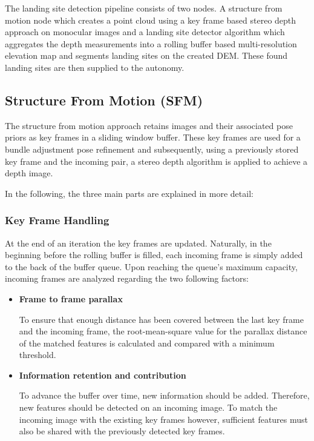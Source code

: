 The landing site detection pipeline consists of two nodes. A structure from motion node \citep{SFM} which creates a point cloud using a key frame based stereo depth approach on monocular images and a landing site detector algorithm \citep{LSD1, LSD2} which aggregates the depth measurements into a rolling buffer based multi-resolution elevation map and segments landing sites on the created DEM. These found landing sites are then supplied to the autonomy. 

\subsection{Structure From Motion (SFM)}\label{subsec:setup:SFM}

The structure from motion approach retains images and their associated pose priors as key frames in a sliding window buffer. These key frames are used for a bundle adjustment pose refinement and subsequently, using a previously stored key frame and the incoming pair, a stereo depth algorithm is applied to achieve a depth image. 

In the following, the three main parts are explained in more detail:

\subsubsection{Key Frame Handling}

At the end of an iteration the key frames are updated. Naturally, in the beginning before the rolling buffer is filled, each incoming frame is simply added to the back of the buffer queue. Upon reaching the queue's maximum capacity, incoming frames are analyzed regarding the two following factors:

\begin{itemize}
    \item \textbf{Frame to frame parallax}

    To ensure that enough distance has been covered between the last key frame and the incoming frame, the root-mean-square value for the parallax distance of the matched features is calculated and compared with a minimum threshold.
    \item \textbf{Information retention and contribution}

    To advance the buffer over time, new information should be added. Therefore, new features should be detected on an incoming image. To match the incoming image with the existing key frames however, sufficient features must also be shared with the previously detected key frames.
\end{itemize}

